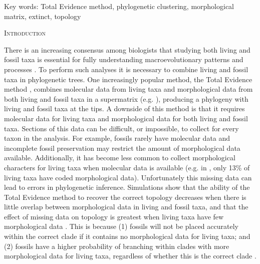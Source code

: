 \documentclass[12pt,letterpaper]{article}
\renewcommand{\section}[1]{%
\bigskip
\begin{center}
\begin{Large}
\normalfont\scshape #1
\medskip
\end{Large}
\end{center}}
\begin{document}
\noindent Key words: Total Evidence method, phylogenetic clustering, morphological matrix, extinct, topology\\

\vspace{1.5in}

%
%
\newpage 
\section{Introduction}

There is an increasing consensus among biologists that studying both living and fossil taxa is essential for fully understanding macroevolutionary patterns and processes \cite{slaterunifying2013,fritzdiversity2013}.
To perform such analyses it is necessary to combine living and fossil taxa in phylogenetic trees.
One increasingly popular method, the Total Evidence method \cite{ronquista2012}, combines molecular data from living taxa and morphological data from both living and fossil taxa in a supermatrix (e.g. \cite{pyrondivergence2011,ronquista2012,schragocombining2013,slaterunifying2013,beckancient2014}), producing a phylogeny with living and fossil taxa at the tips. 
A downside of this method is that it requires molecular data for living taxa and morphological data for both living and fossil taxa.
Sections%
 of this data can be difficult, or impossible, to collect for every taxon in the analysis.
For example, fossils rarely have molecular data and incomplete fossil preservation may restrict the amount of morphological data available.
Additionally, it has become less common to collect morphological characters for living taxa when molecular data is available (e.g. in \cite{slaterphylogenetic2013}, only 13\% of living taxa have coded morphological data).
Unfortunately this missing data can lead to errors in phylogenetic inference.
Simulations show that the ability of the Total Evidence method to recover the correct topology decreases when there is little overlap between morphological data in living and fossil taxa, and that the effect of missing data on topology is greatest when living taxa have few morphological data \cite{GuillermeCooper}.
This is because (1) fossils will not be placed accurately within the correct clade%
 if it contains no morphological data for living taxa; and (2) fossils have a higher probability of branching within clades with more morphological data for living taxa, regardless of whether this is the correct clade \cite{GuillermeCooper}. 
\end{document}

